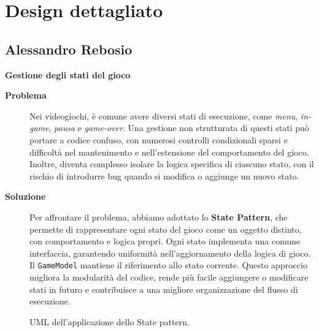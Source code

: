 \documentclass[a4paper,12pt]{report}
\begin{document}
\newpage
\section{Design dettagliato}
\subsection{Alessandro Rebosio}
\textbf{Gestione degli stati del gioco}
\begin{description}
	\item[\textbf{Problema}]
	      Nei videogiochi, è comune avere diversi stati di esecuzione, come \textit{menu}, \textit{in-game}, \textit{pausa} e \textit{game-over}. Una gestione non strutturata di questi stati
	      può portare a codice confuso, con numerosi controlli condizionali sparsi e difficoltà nel mantenimento e nell'estensione del comportamento del gioco. Inoltre, diventa complesso isolare
	      la logica specifica di ciascuno stato, con il rischio di introdurre bug quando si modifica o aggiunge un nuovo stato.

	\item[\textbf{Soluzione}]
	      Per affrontare il problema, abbiamo adottato lo \textbf{State Pattern}, che permette di rappresentare ogni stato del gioco come un oggetto distinto, con comportamento e
	      logica propri. Ogni stato implementa una comune interfaccia, garantendo uniformità nell'aggiornamento della logica di gioco. Il \texttt{GameModel} mantiene il riferimento allo
	      stato corrente. Questo approccio migliora la modularità del codice, rende più facile aggiungere o modificare stati in futuro e contribuisce a una migliore organizzazione
	      del flusso di esecuzione.
\end{description}
\begin{figure}[H]
	\centering{}
	
	\caption{UML dell'applicazione dello State pattern.}
	\label{img:modelstate}
\end{figure}
\end{document}
